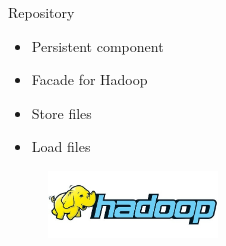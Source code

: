 \begin{frame}{Repository}
	\begin{itemize}
		\item Persistent component
		\item Facade for Hadoop
		\item Store files
		\item Load files
		
	\end{itemize}

	\begin{figure}[htbp]
  		\centering
  		\includegraphics[width=0.4\textwidth]{figures/hadoop}
	\end{figure}
\end{frame}
